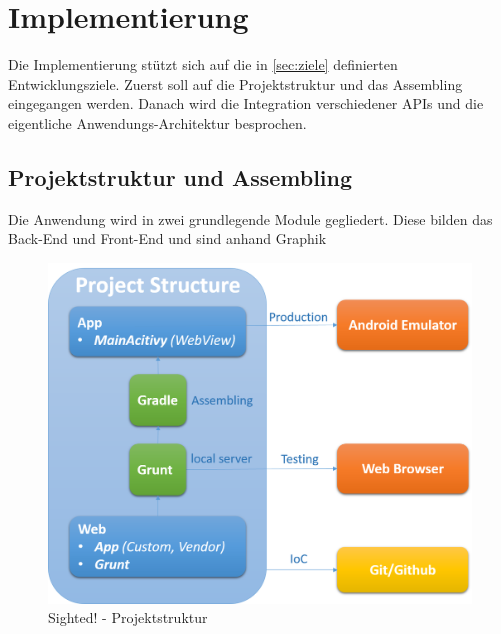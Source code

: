 \chapter{Implementierung}
\label{chap:implementierung}

Die Implementierung stützt sich auf die in \ref{sec:ziele} definierten Entwicklungsziele. Zuerst soll auf die Projektstruktur und das Assembling eingegangen werden. Danach wird die Integration verschiedener APIs und die eigentliche Anwendungs-Architektur besprochen. 


\section{Projektstruktur und Assembling}
\label{sec:struktur}

Die Anwendung wird in zwei grundlegende Module gegliedert. Diese bilden das Back-End und Front-End und sind anhand Graphik  \\

\begin{figure}[H]
  \centering  
  \includegraphics[scale=0.5]{img/project.png}
  \caption{Sighted! - Projektstruktur}
  \label{fig:mapping}
\end{figure}

